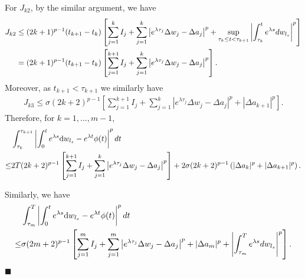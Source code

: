 \documentclass[12pt,a4paper]{article}
\theoremstyle{definition}
\theoremstyle{remark}
\numberwithin{equation}{section}
\newcommand{\Be}{\begin{equation}}
\newcommand{\Ee}{\end{equation}}
\newcommand{\dif}{{\rm d}}
\newenvironment{proof}{\par\noindent{\bf Proof:}}{\hspace*{\fill}$\blacksquare$\par}
\begin{document}
{\begin{proof}
For $J_{k2}$, by the similar argument, we have
\begin{align*}
J_{k2} & \le (2k+1)^{p-1} (t_{k+1}-t_k) \left[\sum_{j=1}^{k}I_j+\sum_{j=1}^{k}\left|e^{\lambda \tau_j} \Delta w_j-\Delta a_j\right|^p+\sup_{\tau_k\le t<\tau_{k+1}}\left|\int_{\tau_{k}}^{t} e^{\lambda s} dw_{l_s}\right|^p\right]\notag \\
&=(2k+1)^{p-1} (t_{k+1}-t_k) \left[\sum_{j=1}^{k+1}I_j+\sum_{j=1}^{k}\left|e^{\lambda \tau_j} \Delta w_j-\Delta a_j\right|^p\right].
\end{align*}
Moreover, as $t_{k+1}<\tau_{k+1}$ we similarly have
\Be
\begin{split}
J_{k3} \le \sigma (2k+2)^{p-1} \left[\sum_{j=1}^{k+1} I_j+\sum_{j=1}^{k}\left|e^{\lambda \tau_j} \Delta w_j-\Delta a_j\right|^p+|\Delta a_{k+1}|^p\right].
\end{split}
\Ee
Therefore, for $k=1,...,m-1$,
\begin{align}\label{eq t1}
&\int_{\tau_{k}}^{\tau_{k+1}} \left|\int_0^t e^{\lambda s}\dif w_{l_s}-e^{\lambda t}\phi(t)\right|^p dt\notag\\
\le& 2T (2k+2)^{p-1} \left[\sum_{j=1}^{k+1} I_j+\sum_{j=1}^{k}\left|e^{\lambda \tau_j} \Delta w_j-\Delta a_j\right|^p\right]+2\sigma (2k+2)^{p-1}\left(|\Delta a_k|^p+|\Delta a_{k+1}|^p\right).
\end{align}

Similarly, we have
 \begin{align}\label{eq t2}
&\int_{\tau_m}^T \left|\int_0^t e^{\lambda s}\dif w_{l_s}-e^{\lambda t} \phi(t)\right|^p dt\notag\\
 \le & \sigma(2m+2)^{p-1}
\left[\sum_{j=1}^m I_j+\sum_{j=1}^m \left|e^{\lambda \tau_j} \Delta w_j-\Delta a_j \right|^p+|\Delta a_m|^p+\left|\int_{\tau_m}^T e^{\lambda s}d w_{l_s}\right|^p\right].
\end{align}


\end{proof}}
\end{document}
